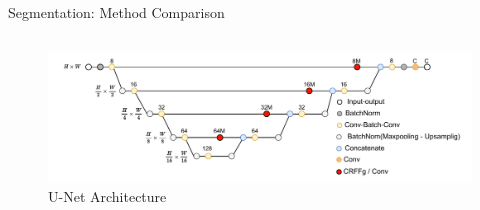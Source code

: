\documentclass[aspectratio=169]{beamer}
\let\oldcite\cite %
\renewcommand{\cite}[1]{{\tiny\oldcite{#1}}}
\begin{document}
\begin{frame}{Segmentation: Method Comparison}
\begin{columns}[t]
    \begin{column}{0.5\textwidth}
      \centering
      \begin{figure}
          \centering \includegraphics[width=1\textwidth]{Figures/unet_arch.pdf}
          \caption{U-Net Architecture \cite{RonnebergerFB15}}
      \end{figure}
    \end{column}
  \end{columns}




\end{frame}
\end{document}
